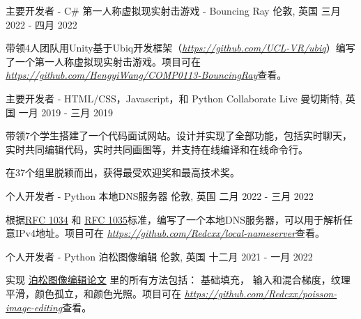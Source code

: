 \begin{cventries}
  \cventry
    {主要开发者 - C\#} %
    {第一人称虚拟现实射击游戏 - Bouncing Ray} %
    {伦敦, 英国} %
    {三月 2022 - 四月 2022} %
    {
      \begin{cvitems} %
        \item {带领4人团队用Unity基于Ubiq开发框架（\href{https://github.com/UCL-VR/ubiq}{\textit{https://github.com/UCL-VR/ubiq}}）编写了一个第一人称虚拟现实射击游戏。项目可在 \href{https://github.com/HengyiWang/COMP0113-BouncingRay}{\textit{https://github.com/HengyiWang/COMP0113-BouncingRay}}查看。}
      \end{cvitems}
    }

  \cventry
    {主要开发者 - HTML/CSS，Javascript，和 Python} %
    {Collaborate Live} %
    {曼切斯特, 英国} %
    {一月 2019 - 三月 2019} %
    {
      \begin{cvitems} %
        \item {带领7个学生搭建了一个代码面试网站。设计并实现了全部功能，包括实时聊天，实时共同编辑代码，实时共同画图等，并支持在线编译和在线命令行。}
        \item {在37个组里脱颖而出，获得最受欢迎奖和最高技术奖。}
      \end{cvitems}
    }
  
  \cventry
    {个人开发者 - Python} %
    {本地DNS服务器} %
    {伦敦, 英国} %
    {二月 2022 - 三月 2022} %
    {
      \begin{cvitems} %
        \item {根据\href{https://datatracker.ietf.org/doc/html/rfc1034}{RFC 1034} 和 \href{https://datatracker.ietf.org/doc/html/rfc1035}{RFC 1035}标准，编写了一个本地DNS服务器，可以用于解析任意IPv4地址。项目可在 \href{https://github.com/Redcxx/local-nameserver}{\textit{https://github.com/Redcxx/local-nameserver}}查看。}
      \end{cvitems}
    }
    
  \cventry
    {个人开发者 - Python} %
    {泊松图像编辑} %
    {伦敦, 英国} %
    {十二月 2021 - 一月 2022} %
    {
      \begin{cvitems} %
        \item {实现 \href{https://www.cs.jhu.edu/~misha/Fall07/Papers/Perez03.pdf}{泊松图像编辑论文} 里的所有方法包括： 基础填充， 输入和混合梯度，纹理平滑，颜色孤立，和颜色光照。项目可在 \href{https://github.com/Redcxx/poisson-image-editing}{\textit{https://github.com/Redcxx/poisson-image-editing}}查看。}
      \end{cvitems}
    }


\end{cventries}
